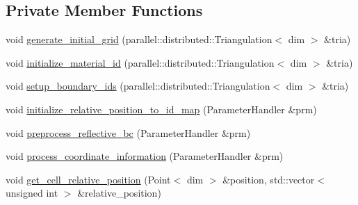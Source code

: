 \subsection*{Private Member Functions}
\begin{DoxyCompactItemize}
\item 
void \hyperlink{class_mesh_generator_a57b433e53fa1b80670a76a1e0c898963}{generate\+\_\+initial\+\_\+grid} (parallel\+::distributed\+::\+Triangulation$<$ dim $>$ \&tria)
\item 
void \hyperlink{class_mesh_generator_a8c0f48b88435360f1209251253912411}{initialize\+\_\+material\+\_\+id} (parallel\+::distributed\+::\+Triangulation$<$ dim $>$ \&tria)
\item 
void \hyperlink{class_mesh_generator_a661d4e5efeb3ee94cc70c5da8e94a0ee}{setup\+\_\+boundary\+\_\+ids} (parallel\+::distributed\+::\+Triangulation$<$ dim $>$ \&tria)
\item 
void \hyperlink{class_mesh_generator_a6d216567b5b599cee526f33d435e6655}{initialize\+\_\+relative\+\_\+position\+\_\+to\+\_\+id\+\_\+map} (Parameter\+Handler \&prm)
\item 
void \hyperlink{class_mesh_generator_a93d10aa06b5b638a859e2fc53dbea5e0}{preprocess\+\_\+reflective\+\_\+bc} (Parameter\+Handler \&prm)
\item 
void \hyperlink{class_mesh_generator_a253330ef901e2a915576f6d6cd4262b5}{process\+\_\+coordinate\+\_\+information} (Parameter\+Handler \&prm)
\item 
void \hyperlink{class_mesh_generator_a9b3414fd31d1d06b0cc4a0c345bc6542}{get\+\_\+cell\+\_\+relative\+\_\+position} (Point$<$ dim $>$ \&position, std\+::vector$<$ unsigned int $>$ \&relative\+\_\+position)
\end{DoxyCompactItemize}
